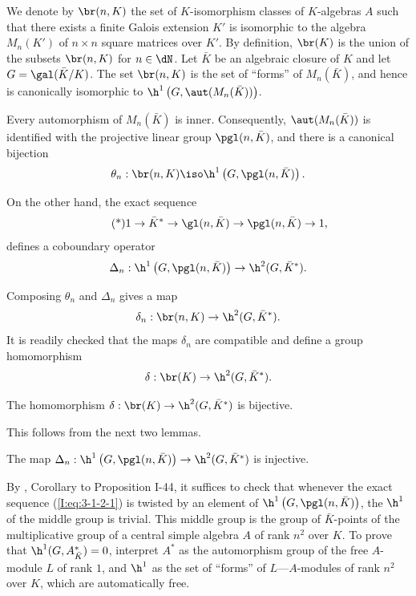 We denote by $\br(n,K)$ the set of $K$-isomorphism classes of
$K$-algebras $A$ such that there exists a finite Galois extension $K'$
 is isomorphic to the algebra $M_n(K')$ of
$n\times n$ square matrices over $K'$. By definition, $\br(K)$ is the
union of the subsets $\br(n,K)$ for $n\in\dN$. Let $\bar K$ be an
algebraic closure of $K$ and let $G=\gal(\bar K/K)$. The set $\br(n,K)$
is the set of “forms” of $M_n(\bar K)$, and hence is canonically
isomorphic to $\h^1\left(G,\aut(M_n(\bar K))\right)$.

Every automorphism of $M_n(\bar K)$ is inner. Consequently,
$\aut(M_n(\bar K))$ is identified with the projective linear group
$\pgl(n,\bar K)$, and there is a canonical bijection
\[
  \theta_n : \br(n,K) \iso \h^1\left(G,\pgl(n,\bar K)\right)\text{.}
\]

On the other hand, the exact sequence
\begin{equation*}\tag{*}\label{I:eq:3-1-2-1}
  1 \to \bar K^* \to \gl(n,\bar K) \to \pgl(n,\bar K) \to 1\text{,}
\end{equation*}
defines a coboundary operator
\[
  \Delta_n : \h^1\left(G,\pgl(n,\bar K)\right) \to \h^2(G,\bar K^*)\text{.}
\]

Composing $\theta_n$ and $\Delta_n$ gives a map
\[
  \delta_n : \br(n,K) \to \h^2(G,\bar K^*)\text{.}
\]
It is readily checked that the maps $\delta_n$ are compatible and define
a group homomorphism
\[
  \delta : \br(K) \to \h^2(G,\bar K^*)\text{.}
\]

\begin{proposition}\label{I:3-1-3}
The homomorphism $\delta:\br(K)\to\h^2(G,\bar K^*)$ is bijective.
\end{proposition}

This follows from the next two lemmas.

\begin{lemma}\label{I:3-1-4}
The map
$\Delta_n:\h^1\left(G,\pgl(n,\bar K)\right)\to
\h^2(G,\bar K^*)$ is injective.
\end{lemma}

By \cite{se94}, Corollary to Proposition I-44, it suffices to check that
whenever the exact sequence (\ref{I:eq:3-1-2-1}) is twisted by an element
of $\h^1\left(G,\pgl(n,\bar K)\right)$, the $\h^1$ of the middle group
is trivial. This middle group is the group of $\bar K$-points of the
multiplicative group of a central simple algebra $A$ of rank $n^2$ over
$K$. To prove that $\h^1(G,A_{\bar K}^*)=0$, interpret $A^*$
as the automorphism group of the free $A$-module $L$ of rank $1$, and
$\h^1$ as the set of “forms” of $L$---$A$-modules of rank $n^2$ over
$K$, which are automatically free.

